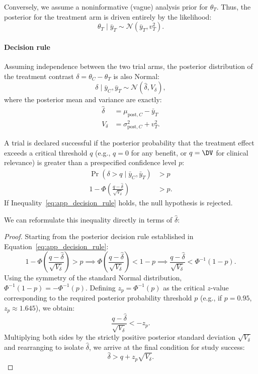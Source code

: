 Conversely, we assume a noninformative (vague) analysis prior for $\theta_T$. Thus, the posterior for the treatment arm is driven entirely by the likelihood:
$$
    \theta_T \mid \bar{y}_T \sim \mathcal{N}(\bar{y}_T, v_T^2).
$$

\paragraph{Decision rule}
Assuming independence between the two trial arms, the posterior distribution of the treatment contrast $\delta = \theta_C - \theta_T$ is also Normal:
$$
    \delta \mid \bar{y}_C, \bar{y}_T \sim \mathcal{N}(\hat{\delta}, V_{\delta}),
$$
where the posterior mean and variance are exactly:
\begin{align*}
    \hat{\delta} &= \mu_{\text{post},C} - \bar{y}_T \\
    V_{\delta} &= \sigma_{\text{post},C}^2 + v_T^2.
\end{align*}

A trial is declared successful if the posterior probability that the treatment effect exceeds a critical threshold $q$ (e.g., $q=0$ for any benefit, or $q=\DV$ for clinical relevance) is greater than a prespecified confidence level $p$:
\begin{align}
    \Pr(\delta > q \mid \bar{y}_C, \bar{y}_T) &> p \nonumber \\
    1 - \Phi\left( \frac{q - \hat{\delta}}{\sqrt{V_{\delta}}} \right) &> p. \label{eq:app_decision_rule}
\end{align}
If Inequality~\eqref{eq:app_decision_rule} holds, the null hypothesis is rejected.

We can reformulate this inequality directly in terms of $\hat{\delta}$:
\begin{proof}
Starting from the posterior decision rule established in Equation~\eqref{eq:app_decision_rule}:
$$
    1 - \Phi\left( \frac{q - \hat{\delta}}{\sqrt{V_{\delta}}} \right) > p \implies \Phi\left( \frac{q - \hat{\delta}}{\sqrt{V_{\delta}}} \right) < 1 - p \implies \frac{q - \hat{\delta}}{\sqrt{V_{\delta}}} < \Phi^{-1}(1 - p).
$$
Using the symmetry of the standard Normal distribution, $\Phi^{-1}(1 - p) = - \Phi^{-1}(p)$. Defining $z_p = \Phi^{-1}(p)$ as the critical $z$-value corresponding to the required posterior probability threshold $p$ (e.g., if $p = 0.95$, $z_p \approx 1.645$), we obtain:
$$
    \frac{q - \hat{\delta}}{\sqrt{V_{\delta}}} < -z_p.
$$
Multiplying both sides by the strictly positive posterior standard deviation $\sqrt{V_{\delta}}$ and rearranging to isolate $\hat{\delta}$, we arrive at the final condition for study success:
\begin{equation} \label{eq:app_success_condition_delta}
    \hat{\delta} > q + z_p \sqrt{V_{\delta}}.
\end{equation}
\end{proof}

